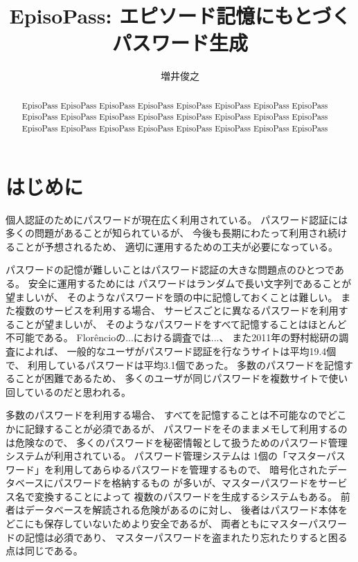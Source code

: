 \documentclass[twoside]{wiss}
\begin{document}
\title{EpisoPass: エピソード記憶にもとづくパスワード生成}

\author{増井俊之}

\begin{abstract}
EpisoPass EpisoPass EpisoPass EpisoPass EpisoPass EpisoPass 
EpisoPass EpisoPass EpisoPass EpisoPass EpisoPass EpisoPass 
EpisoPass EpisoPass EpisoPass EpisoPass EpisoPass EpisoPass 
EpisoPass EpisoPass EpisoPass EpisoPass EpisoPass EpisoPass 
\end{abstract}

\maketitle

\section{はじめに}

個人認証のためにパスワードが現在広く利用されている。
パスワード認証には多くの問題があることが知られているが\cite{増井_ユニマガ}、
今後も長期にわたって利用され続けることが予想されるため、
適切に運用するための工夫が必要になっている。

パスワードの記憶が難しいことはパスワード認証の大きな問題点のひとつである。
安全に運用するためには
パスワードはランダムで長い文字列であることが望ましいが、
そのようなパスワードを頭の中に記憶しておくことは難しい。
また複数のサービスを利用する場合、
サービスごとに異なるパスワードを利用することが望ましいが、
そのようなパスワードをすべて記憶することはほとんど不可能である。
%
Flor\^{e}ncioの...における調査では...\cite{Florencio:2007:LSW:1242572.1242661}、
また2011年の野村総研の調査によれば、
一般的なユーザがパスワード認証を行なうサイトは平均19.4個で、
利用しているパスワードは平均3.1個であった\cite{野村総研}。
多数のパスワードを記憶することが困難であるため、
多くのユーザが同じパスワードを複数サイトで使い回しているのだと思われる。

多数のパスワードを利用する場合、
すべてを記憶することは不可能なのでどこかに記録することが必須であるが、
パスワードをそのままメモして利用するのは危険なので、
多くのパスワードを秘密情報として扱うためのパスワード管理システムが利用されている。
パスワード管理システムは
1個の「マスターパスワード」を利用してあらゆるパスワードを管理するもので、
暗号化されたデータベースにパスワードを格納するもの%
\cite{OnePassword}%
\cite{Dashlane}%
\cite{ミルパス}%
\cite{LastPass}%
\cite{KeyPass}%
\cite{NortonIDSafe}%
\cite{IDManager}%
が多いが、マスターパスワードをサービス名で変換することによって
複数のパスワードを生成するシステム\cite{SuperGenPass}もある。
前者はデータベースを解読される危険があるのに対し、
後者はパスワード本体をどこにも保存していないためより安全であるが、
両者ともにマスターパスワードの記憶は必須であり、
マスターパスワードを盗まれたり忘れたりすると困る点は同じである。
\end{document}
